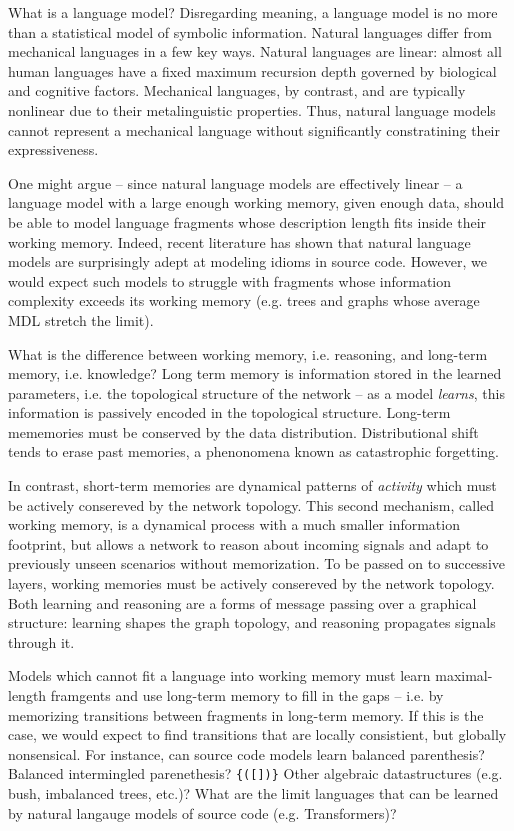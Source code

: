 \documentclass[10pt]{article}
\begin{document}
  What is a language model? Disregarding meaning, a language model is no more than a statistical model of symbolic information. Natural languages differ from mechanical languages in a few key ways. Natural languages are linear: almost all human languages have a fixed maximum recursion depth governed by biological and cognitive factors. Mechanical languages, by contrast, and are typically nonlinear due to their metalinguistic properties. Thus, natural language models cannot represent a mechanical language without significantly constratining their expressiveness.

  One might argue -- since natural language models are effectively linear -- a language model with a large enough working memory, given enough data, should be able to model language fragments whose description length fits inside their working memory. Indeed, recent literature has shown that natural language models are surprisingly adept at modeling idioms in source code. However, we would expect such models to struggle with fragments whose information complexity exceeds its working memory (e.g. trees and graphs whose average MDL stretch the limit).

  What is the difference between working memory, i.e. reasoning, and long-term memory, i.e. knowledge? Long term memory is information stored in the learned parameters, i.e. the topological structure of the network -- as a model \textit{learns}, this information is passively encoded in the topological structure. Long-term mememories must be conserved by the data distribution. Distributional shift tends to erase past memories, a phenonomena known as catastrophic forgetting.

  In contrast, short-term memories are dynamical patterns of \textit{activity} which must be actively consereved by the network topology. This second mechanism, called working memory, is a dynamical process with a much smaller information footprint, but allows a network to reason about incoming signals and adapt to previously unseen scenarios without memorization. To be passed on to successive layers, working memories must be actively consereved by the network topology. Both learning and reasoning are a forms of message passing over a graphical structure: learning shapes the graph topology, and reasoning propagates signals through it.

  Models which cannot fit a language into working memory must learn maximal-length framgents and use long-term memory to fill in the gaps -- i.e. by memorizing transitions between fragments in long-term memory. If this is the case, we would expect to find transitions that are locally consistient, but globally nonsensical. For instance, can source code models learn balanced parenthesis? Balanced intermingled parenethesis? \texttt{\{([])\}} Other algebraic datastructures (e.g. bush, imbalanced trees, etc.)? What are the limit languages that can be learned by natural langauge models of source code (e.g. Transformers)?
\end{document}
